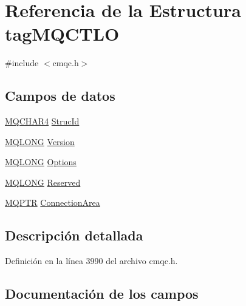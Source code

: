 \hypertarget{structtag_m_q_c_t_l_o}{}\section{Referencia de la Estructura tag\+M\+Q\+C\+T\+L\+O}
\label{structtag_m_q_c_t_l_o}


{\ttfamily \#include $<$cmqc.\+h$>$}

\subsection*{Campos de datos}
\begin{DoxyCompactItemize}
\item 
\hyperlink{cmqc_8h_a12590e546ed66fda7cf21c1d5cefa31d}{M\+Q\+C\+H\+A\+R4} \hyperlink{structtag_m_q_c_t_l_o_a0530922ca944569b52601d74941f96e4}{Struc\+Id}
\item 
\hyperlink{cmqc_8h_a1fb8d28cbda3fa8766a9821230cdb6d5}{M\+Q\+L\+O\+N\+G} \hyperlink{structtag_m_q_c_t_l_o_a0656ef8f766b3907d394d88a35d7b7e9}{Version}
\item 
\hyperlink{cmqc_8h_a1fb8d28cbda3fa8766a9821230cdb6d5}{M\+Q\+L\+O\+N\+G} \hyperlink{structtag_m_q_c_t_l_o_ad7aff2d6c6044809464380998d24ec5c}{Options}
\item 
\hyperlink{cmqc_8h_a1fb8d28cbda3fa8766a9821230cdb6d5}{M\+Q\+L\+O\+N\+G} \hyperlink{structtag_m_q_c_t_l_o_a94dbfe0ea37eb47bd07d4d79d7104b2c}{Reserved}
\item 
\hyperlink{cmqc_8h_a0b835d8e479d7c42242ed9c6b6572f5a}{M\+Q\+P\+T\+R} \hyperlink{structtag_m_q_c_t_l_o_a58c83e52e3187c1579e9aeb6c52ded13}{Connection\+Area}
\end{DoxyCompactItemize}


\subsection{Descripción detallada}


Definición en la línea 3990 del archivo cmqc.\+h.



\subsection{Documentación de los campos}
\hypertarget{structtag_m_q_c_t_l_o_a58c83e52e3187c1579e9aeb6c52ded13}{}
